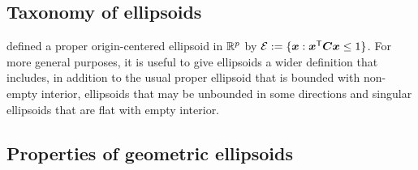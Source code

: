 \subsection{Taxonomy of ellipsoids}
 defined a proper origin-centered ellipsoid in  $\mathbb{R}^{p}$ by
$\mathcal{E} := \{ \bm{x}: \bm{x}^\mathsf{T} \bm{C} \bm{x} \le 1 \}$.
For more general purposes, it is useful to give ellipsoids a wider definition that includes, in addition to the usual proper ellipsoid that is bounded with non-empty interior,  
ellipsoids that may be unbounded in some directions and singular ellipsoids that are flat with empty interior.


\subsection{Properties of geometric ellipsoids}\label{sec:properties}

